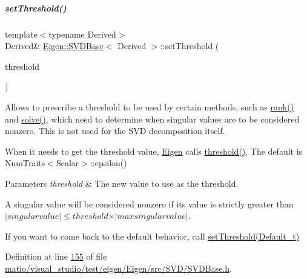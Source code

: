 \mbox{\label{group___s_v_d___module_a1c95d05398fc15e410a28560ef70a5a6}} 
\subparagraph{\texorpdfstring{set\+Threshold()}{setThreshold()}\hspace{0.1cm}{\footnotesize\ttfamily [2/4]}}
{\footnotesize\ttfamily template$<$typename Derived$>$ \\
Derived\& \hyperlink{group___s_v_d___module_class_eigen_1_1_s_v_d_base}{Eigen\+::\+S\+V\+D\+Base}$<$ Derived $>$\+::set\+Threshold (\begin{DoxyParamCaption}\item[{const Real\+Scalar \&}]{threshold }\end{DoxyParamCaption})\hspace{0.3cm}{\ttfamily [inline]}}

Allows to prescribe a threshold to be used by certain methods, such as \hyperlink{group___s_v_d___module_a30b89e24f42f1692079eea31b361d26a}{rank()} and \hyperlink{group___s_v_d___module_ab28499936c0764fe5b56b9f4de701e26}{solve()}, which need to determine when singular values are to be considered nonzero. This is not used for the S\+VD decomposition itself.

When it needs to get the threshold value, \hyperlink{namespace_eigen}{Eigen} calls \hyperlink{group___s_v_d___module_a98b2ee98690358951807353812a05c69}{threshold()}. The default is {\ttfamily Num\+Traits$<$\+Scalar$>$\+::epsilon()} 


\begin{DoxyParams}{Parameters}
{\em threshold} & The new value to use as the threshold.\\
\hline
\end{DoxyParams}
A singular value will be considered nonzero if its value is strictly greater than $ \vert singular value \vert \leqslant threshold \times \vert max singular value \vert $.

If you want to come back to the default behavior, call \hyperlink{group___s_v_d___module_a27586b69dbfb63f714d1d45fd6304f97}{set\+Threshold(\+Default\+\_\+t)} 

Definition at line \hyperlink{matio_2visual__studio_2test_2eigen_2_eigen_2src_2_s_v_d_2_s_v_d_base_8h_source_l00155}{155} of file \hyperlink{matio_2visual__studio_2test_2eigen_2_eigen_2src_2_s_v_d_2_s_v_d_base_8h_source}{matio/visual\+\_\+studio/test/eigen/\+Eigen/src/\+S\+V\+D/\+S\+V\+D\+Base.\+h}.

